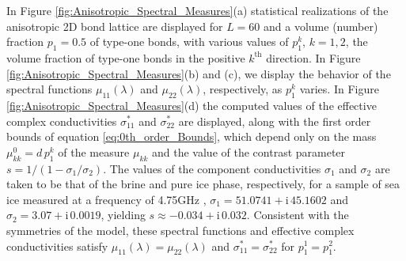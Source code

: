\documentclass{cmslatex}
\newcommand{\I}{\mathrm{i}}
\begin{document}
In Figure \ref{fig:Anisotropic_Spectral_Measures}(a) statistical
realizations of the anisotropic 2D bond lattice are displayed for
$L=60$ and a volume (number) fraction $p_1=0.5$ of type-one bonds,
with various values of $p_1^k$, $k=1,2$, the volume fraction of
type-one bonds in the positive $k^{\text{th}}$ direction. In Figure
\ref{fig:Anisotropic_Spectral_Measures}(b) and (c), we display the
behavior of the spectral functions $\mu_{11}(\lambda)$ and $\mu_{22}(\lambda)$,
respectively, as $p_1^k$ varies. In Figure
\ref{fig:Anisotropic_Spectral_Measures}(d) the computed values of the
effective complex conductivities $\sigma^*_{11}$ and $\sigma^*_{22}$ are   
displayed, along with the first order bounds of equation
\eqref{eq:0th_order_Bounds}, which depend only on the mass
$\mu^0_{kk}=d\,p_1^k$ of the measure $\mu_{kk}$ and the value of the contrast parameter
$s=1/(1-\sigma_1/\sigma_2)$. The values of the component conductivities $\sigma_1$
and $\sigma_2$ are taken to be that of the brine and pure ice phase,
respectively, for a sample of sea ice measured at a frequency of
4.75GHz \cite{Backstrom:2007:Book}, $\sigma_1=51.0741+\I\,45.1602$ and 
$\sigma_2=3.07+\I\,0.0019$, yielding
$s\approx-0.034+\I\,0.032$. Consistent with the symmetries of
the model, these spectral functions and effective complex
conductivities satisfy $\mu_{11}(\lambda)=\mu_{22}(\lambda)$ and $\sigma^*_{11}=\sigma^*_{22}$
for $p_1^1=p_1^2$. 
\end{document}
